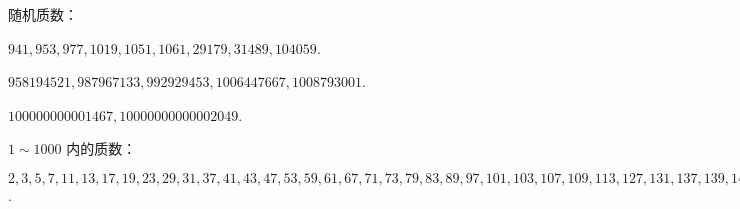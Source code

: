 随机质数：

$941, 953, 977, 1019, 1051, 1061, 29179, 31489, 104059$.

$958194521, 987967133, 992929453, 1006447667, 1008793001$.

$100000000001467, 10000000000002049$.

$1\sim 1000$ 内的质数：

$2, 3, 5, 7, 11, 13, 17, 19, 23, 29, 31, 37, 41, 43, 47, 53, 59, 61, 67, 71, 73, 79, 83, 89, 97, 101, 103, 107, 109, 113, 127, 131, 137, 139, 149, 151, 157, 163, 167, 173, 179, 181, 191, 193, 197, 199, 211, 223, 227, 229, 233, 239, 241, 251, 257, 263, 269, 271, 277, 281, 283, 293, 307, 311, 313, 317, 331, 337, 347, 349, 353, 359, 367, 373, 379, 383, 389, 397, 401, 409, 419, 421, 431, 433, 439, 443, 449, 457, 461, 463, 467, 479, 487, 491, 499, 503, 509, 521, 523, 541, 547, 557, 563, 569, 571, 577, 587, 593, 599, 601, 607, 613, 617, 619, 631, 641, 643, 647, 653, 659, 661, 673, 677, 683, 691, 701, 709, 719, 727, 733, 739, 743, 751, 757, 761, 769, 773, 787, 797, 809, 811, 821, 823, 827, 829, 839, 853, 857, 859, 863, 877, 881, 883, 887, 907, 911, 919, 929, 937, 941, 947, 953, 967, 971, 977, 983, 991, 997$.